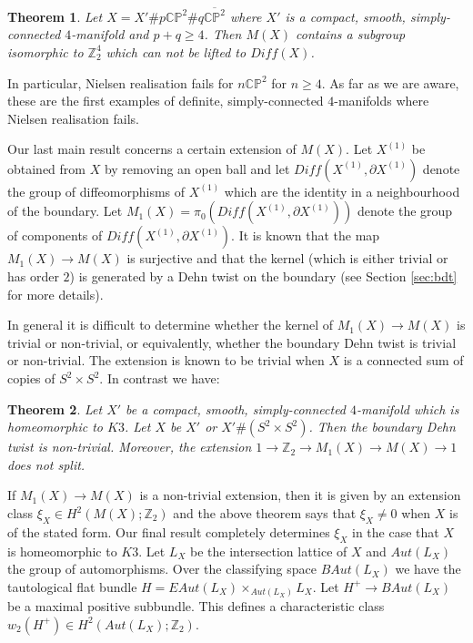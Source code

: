\documentclass{amsart}
\newtheorem{theorem}{Theorem}[section]
\theoremstyle{definition}
\theoremstyle{remark}
\numberwithin{equation}{section}
\begin{document}
\begin{theorem}\label{thm:n}
Let $X = X' \# p \mathbb{CP}^2 \# q \overline{\mathbb{CP}^2}$ where $X'$ is a compact, smooth, simply-connected $4$-manifold and $p+q \ge 4$. Then $M(X)$ contains a subgroup isomorphic to $\mathbb{Z}_2^4$ which can not be lifted to $Diff(X)$.
\end{theorem}

In particular, Nielsen realisation fails for $n \mathbb{CP}^2$ for $n \ge 4$. As far as we are aware, these are the first examples of definite, simply-connected $4$-manifolds where Nielsen realisation fails.

Our last main result concerns a certain extension of $M(X)$. Let $X^{(1)}$ be obtained from $X$ by removing an open ball and let $Diff(X^{(1)} , \partial X^{(1)})$ denote the group of diffeomorphisms of $X^{(1)}$ which are the identity in a neighbourhood of the boundary. Let $M_1(X) = \pi_0( Diff( X^{(1)} , \partial X^{(1)} ))$ denote the group of components of $Diff( X^{(1)} , \partial X^{(1)})$. It is known that the map $M_1(X) \to M(X)$ is surjective and that the kernel (which is either trivial or has order $2$) is generated by a Dehn twist on the boundary (see Section \ref{sec:bdt} for more details).

In general it is difficult to determine whether the kernel of $M_1(X) \to M(X)$ is trivial or non-trivial, or equivalently, whether the boundary Dehn twist is trivial or non-trivial. The extension is known to be trivial when $X$ is a connected sum of copies of $S^2 \times S^2$. In contrast we have:

\begin{theorem}\label{thm:phi0}
Let $X'$ be a compact, smooth, simply-connected $4$-manifold which is homeomorphic to $K3$. Let $X$ be $X'$ or $X' \# (S^2 \times S^2)$. Then the boundary Dehn twist is non-trivial. Moreover, the extension $1 \to \mathbb{Z}_2 \to M_1(X) \to M(X) \to 1$ does not split.
\end{theorem}

If $M_1(X) \to M(X)$ is a non-trivial extension, then it is given by an extension class $\xi_X \in H^2( M(X) ; \mathbb{Z}_2)$ and the above theorem says that $\xi_X \neq 0$ when $X$ is of the stated form. Our final result completely determines $\xi_X$ in the case that $X$ is homeomorphic to $K3$. Let $L_X$ be the intersection lattice of $X$ and $Aut(L_X)$ the group of automorphisms. Over the classifying space $BAut(L_X)$ we have the tautological flat bundle $H = EAut(L_X) \times_{Aut(L_X)} L_X$. Let $H^+ \to BAut(L_X)$ be a maximal positive subbundle. This defines a characteristic class $w_2(H^+) \in H^2( Aut(L_X) ; \mathbb{Z}_2)$.
\end{document}
